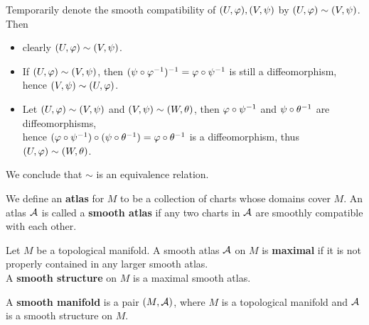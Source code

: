 Temporarily denote the smooth compatibility of $(U,\varphi), (V,\psi)$ by $(U,\varphi) \sim (V,\psi)$. Then 
\begin{itemize}
    \item clearly $(U,\varphi) \sim (V,\psi)$.  
    \item If $(U,\varphi) \sim (V,\psi)$, then $(\psi \circ \varphi^{-1})^{-1} = \varphi \circ \psi^{-1}$ is still a diffeomorphism, hence $(V, \psi) \sim (U, \varphi)$.
    \item Let $(U,\varphi) \sim (V,\psi)$ and $(V,\psi) \sim (W,\theta)$, then 
    $\varphi \circ \psi^{-1}$ and $\psi \circ \theta^{-1}$ are diffeomorphisms, \\ hence $(\varphi \circ \psi^{-1}) \circ (\psi \circ \theta^{-1}) = \varphi \circ \theta^{-1}$ is a diffeomorphism, thus $(U,\varphi) \sim (W,\theta)$. 
\end{itemize}
We conclude that $\sim$ is an equivalence relation. 
\begin{definition}[atlas]
    We define an \textbf{atlas} for $M$ to be a collection of charts whose domains cover $M$. An atlas $\mathcal{A}$ is called a \textbf{smooth atlas} if any two charts in $\mathcal{A}$ are smoothly compatible with each other. 
\end{definition}
\begin{definition}
    Let $M$ be a topological manifold.
    A smooth atlas $\mathcal{A}$ on $M$ is \textbf{maximal} if it is not properly contained in any larger smooth atlas. \\
    A \textbf{smooth structure} on $M$ is a maximal smooth atlas. 
\end{definition}

\begin{definition}
    A \textbf{smooth manifold} is a pair $(M, \mathcal{A})$, where $M$ is a topological manifold and $\mathcal{A}$ is a smooth structure on $M$. 
\end{definition}

